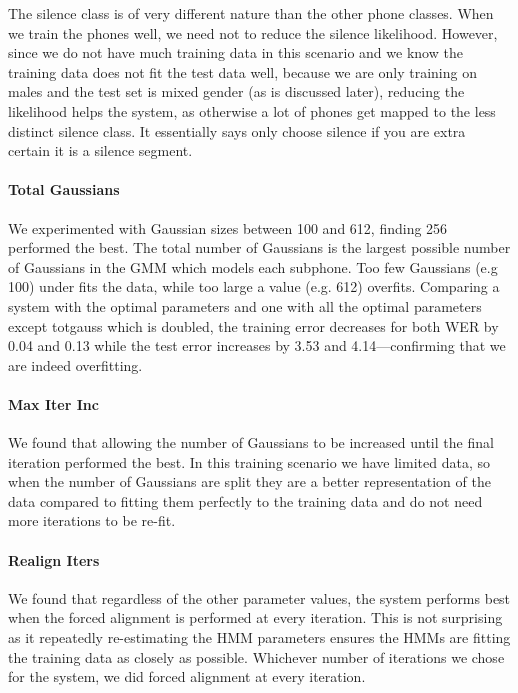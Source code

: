 \documentclass[twocolumn, 11pt]{article}
\begin{document}
The silence class is of very different nature than the other phone classes.
When we train the phones well, we need not to reduce the silence likelihood. 
However, since we do not have much training
data in this scenario and we know the training data does not fit the test data
well, because we are only training on males and the test set is mixed gender
(as is discussed later), reducing the likelihood helps the system, as otherwise
a lot of phones get mapped to the less distinct silence class. It
essentially says only choose silence if you are extra certain it is a silence
segment.

\paragraph{Total Gaussians}
We experimented with Gaussian sizes between 100 and 612, finding 256 performed
the best. The total number of Gaussians is the largest possible number of
Gaussians in the GMM which models each subphone. Too few Gaussians (e.g 100)
under fits the data, while too large a value (e.g. 612) overfits. Comparing a
system with the optimal parameters and one with all the optimal parameters
except totgauss which is doubled, the training error decreases for both WER by
0.04 and 0.13 while the test error increases by 3.53 and 4.14---confirming
that we are indeed overfitting.

\paragraph{Max Iter Inc}
We found that allowing the number of Gaussians to be increased until the 
final iteration performed the best. In this training scenario we have limited data, 
so when the number of Gaussians are split they are a better representation 
of the data compared to fitting them perfectly to the training data and do not 
need more iterations to be re-fit. 

\paragraph{Realign Iters}
We found that regardless of the other parameter values, the system performs
best when the forced alignment is performed at every iteration. This is not
surprising as it repeatedly re-estimating the HMM parameters ensures the HMMs
are fitting the training data as closely as possible. Whichever number of
iterations we chose for the system, we did forced alignment at every
iteration.
\end{document}
